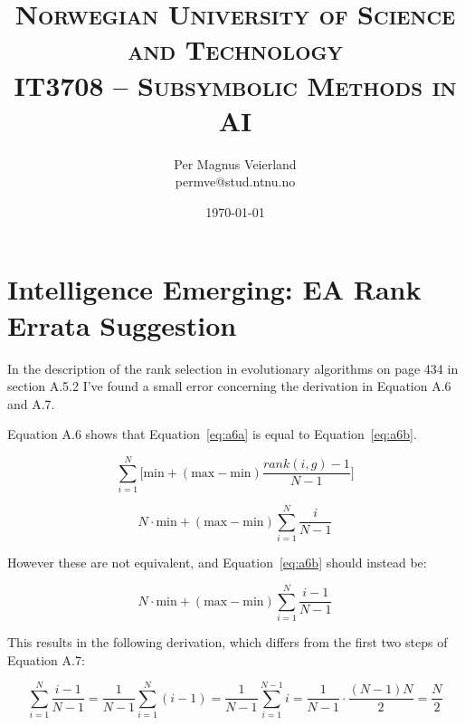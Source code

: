 

\title{
\normalfont \normalsize
\textsc{Norwegian University of Science and Technology\\IT3708 -- Subsymbolic Methods in AI}
}

\author{Per Magnus Veierland\\permve@stud.ntnu.no}

\date{\normalsize\today}



\fancyfoot[C]{}
\maketitle

\section*{Intelligence Emerging: EA Rank Errata Suggestion}

In the description of the rank selection in evolutionary algorithms on page 434 in section A.5.2 I've found a small error concerning the derivation in Equation A.6 and A.7.

Equation A.6 shows that Equation~\ref{eq:a6a} is equal to Equation~\ref{eq:a6b}.

\begin{equation}
\label{eq:a6a}
\sum_{i=1}^{N}\Bigg[ \text{min} + (\text{max} - \text{min})\frac{\textit{rank}(i, g) - 1}{N - 1}\Bigg]
\end{equation}

\begin{equation}
\label{eq:a6b}
N \cdot \text{min} + (\text{max} - \text{min}) \sum_{i=1}^{N}\frac{i}{N - 1}
\end{equation}

However these are not equivalent, and Equation~\ref{eq:a6b} should instead be:

\begin{equation}
N \cdot \text{min} + (\text{max} - \text{min}) \sum_{i=1}^{N}\frac{i - 1}{N - 1}
\end{equation}

This results in the following derivation, which differs from the first two steps of Equation A.7:

\begin{equation}
\sum_{i=1}^{N}\frac{i - 1}{N - 1} =
\frac{1}{N - 1}\sum_{i=1}^{N}(i - 1) =
\frac{1}{N - 1}\sum_{i=1}^{N - 1}i =
\frac{1}{N - 1} \cdot \frac{(N - 1)N}{2} =
\frac{N}{2}
\end{equation}



